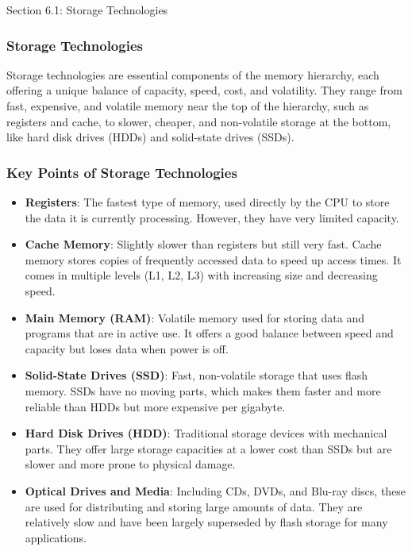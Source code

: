 \begin{notes}{Section 6.1: Storage Technologies}
    \subsubsection*{Storage Technologies}

    Storage technologies are essential components of the memory hierarchy, each offering a unique balance of capacity, speed, cost, and volatility. They range from fast, expensive, and volatile memory 
    near the top of the hierarchy, such as registers and cache, to slower, cheaper, and non-volatile storage at the bottom, like hard disk drives (HDDs) and solid-state drives (SSDs).
    
    \vspace*{1em}
    
    \subsubsection*{Key Points of Storage Technologies}
    
    \begin{itemize}
        \item \textbf{Registers}: The fastest type of memory, used directly by the CPU to store the data it is currently processing. However, they have very limited capacity.
        \item \textbf{Cache Memory}: Slightly slower than registers but still very fast. Cache memory stores copies of frequently accessed data to speed up access times. It comes in multiple levels 
        (L1, L2, L3) with increasing size and decreasing speed.
        \item \textbf{Main Memory (RAM)}: Volatile memory used for storing data and programs that are in active use. It offers a good balance between speed and capacity but loses data when power is off.
        \item \textbf{Solid-State Drives (SSD)}: Fast, non-volatile storage that uses flash memory. SSDs have no moving parts, which makes them faster and more reliable than HDDs but more expensive 
        per gigabyte.
        \item \textbf{Hard Disk Drives (HDD)}: Traditional storage devices with mechanical parts. They offer large storage capacities at a lower cost than SSDs but are slower and more prone to physical 
        damage.
        \item \textbf{Optical Drives and Media}: Including CDs, DVDs, and Blu-ray discs, these are used for distributing and storing large amounts of data. They are relatively slow and have been largely 
        superseded by flash storage for many applications.
    \end{itemize}
    

\end{notes}
